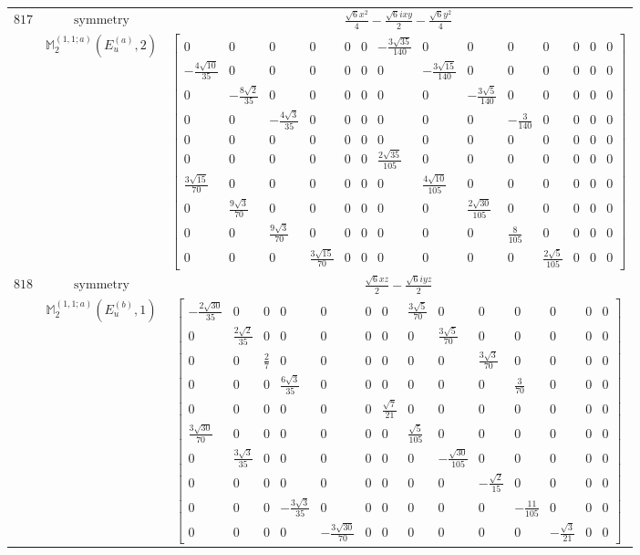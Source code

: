 \documentclass[fleqn,8pt,landscape]{jsarticle}
\begin{document}
\begin{longtable}{ccc}
$ 817 $ & $ \text{symmetry} $ & $ \frac{\sqrt{6} x^{2}}{4} - \frac{\sqrt{6} i x y}{2} - \frac{\sqrt{6} y^{2}}{4} $ \\
$  $ & $ \mathbb{M}_{2}^{(1,1;a)}(E_{u}^{(a)},2) $ & $ \begin{bmatrix} 0 & 0 & 0 & 0 & 0 & 0 & - \frac{3 \sqrt{35}}{140} & 0 & 0 & 0 & 0 & 0 & 0 & 0 \\ - \frac{4 \sqrt{10}}{35} & 0 & 0 & 0 & 0 & 0 & 0 & - \frac{3 \sqrt{15}}{140} & 0 & 0 & 0 & 0 & 0 & 0 \\ 0 & - \frac{8 \sqrt{2}}{35} & 0 & 0 & 0 & 0 & 0 & 0 & - \frac{3 \sqrt{5}}{140} & 0 & 0 & 0 & 0 & 0 \\ 0 & 0 & - \frac{4 \sqrt{3}}{35} & 0 & 0 & 0 & 0 & 0 & 0 & - \frac{3}{140} & 0 & 0 & 0 & 0 \\ 0 & 0 & 0 & 0 & 0 & 0 & 0 & 0 & 0 & 0 & 0 & 0 & 0 & 0 \\ 0 & 0 & 0 & 0 & 0 & 0 & \frac{2 \sqrt{35}}{105} & 0 & 0 & 0 & 0 & 0 & 0 & 0 \\ \frac{3 \sqrt{15}}{70} & 0 & 0 & 0 & 0 & 0 & 0 & \frac{4 \sqrt{10}}{105} & 0 & 0 & 0 & 0 & 0 & 0 \\ 0 & \frac{9 \sqrt{3}}{70} & 0 & 0 & 0 & 0 & 0 & 0 & \frac{2 \sqrt{30}}{105} & 0 & 0 & 0 & 0 & 0 \\ 0 & 0 & \frac{9 \sqrt{3}}{70} & 0 & 0 & 0 & 0 & 0 & 0 & \frac{8}{105} & 0 & 0 & 0 & 0 \\ 0 & 0 & 0 & \frac{3 \sqrt{15}}{70} & 0 & 0 & 0 & 0 & 0 & 0 & \frac{2 \sqrt{5}}{105} & 0 & 0 & 0 \end{bmatrix} $ \\ \hline
$ 818 $ & $ \text{symmetry} $ & $ \frac{\sqrt{6} x z}{2} - \frac{\sqrt{6} i y z}{2} $ \\
$  $ & $ \mathbb{M}_{2}^{(1,1;a)}(E_{u}^{(b)},1) $ & $ \begin{bmatrix} - \frac{2 \sqrt{30}}{35} & 0 & 0 & 0 & 0 & 0 & 0 & \frac{3 \sqrt{5}}{70} & 0 & 0 & 0 & 0 & 0 & 0 \\ 0 & \frac{2 \sqrt{2}}{35} & 0 & 0 & 0 & 0 & 0 & 0 & \frac{3 \sqrt{5}}{70} & 0 & 0 & 0 & 0 & 0 \\ 0 & 0 & \frac{2}{7} & 0 & 0 & 0 & 0 & 0 & 0 & \frac{3 \sqrt{3}}{70} & 0 & 0 & 0 & 0 \\ 0 & 0 & 0 & \frac{6 \sqrt{3}}{35} & 0 & 0 & 0 & 0 & 0 & 0 & \frac{3}{70} & 0 & 0 & 0 \\ 0 & 0 & 0 & 0 & 0 & 0 & \frac{\sqrt{7}}{21} & 0 & 0 & 0 & 0 & 0 & 0 & 0 \\ \frac{3 \sqrt{30}}{70} & 0 & 0 & 0 & 0 & 0 & 0 & \frac{\sqrt{5}}{105} & 0 & 0 & 0 & 0 & 0 & 0 \\ 0 & \frac{3 \sqrt{3}}{35} & 0 & 0 & 0 & 0 & 0 & 0 & - \frac{\sqrt{30}}{105} & 0 & 0 & 0 & 0 & 0 \\ 0 & 0 & 0 & 0 & 0 & 0 & 0 & 0 & 0 & - \frac{\sqrt{2}}{15} & 0 & 0 & 0 & 0 \\ 0 & 0 & 0 & - \frac{3 \sqrt{3}}{35} & 0 & 0 & 0 & 0 & 0 & 0 & - \frac{11}{105} & 0 & 0 & 0 \\ 0 & 0 & 0 & 0 & - \frac{3 \sqrt{30}}{70} & 0 & 0 & 0 & 0 & 0 & 0 & - \frac{\sqrt{3}}{21} & 0 & 0 \end{bmatrix} $ \\ \hline

\end{longtable}
\end{document}
